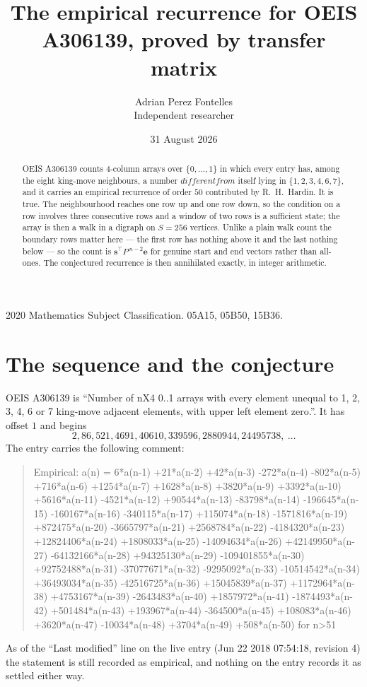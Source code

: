 \documentclass[11pt,a4paper]{article}
\title{The empirical recurrence for OEIS A306139, proved by transfer matrix}
\author{Adrian Perez Fontelles\\ \small Independent researcher}
\date{31 August 2026}
\theoremstyle{plain}
\theoremstyle{definition}
\begin{document}
\maketitle

\begin{abstract}
OEIS A306139 counts $4$-column arrays over $\{0,\dots,1\}$ in which every entry has,
among the eight king-move neighbours, a number $different from$ itself lying in $\{1,2,3,4,6,7\}$, and it carries an empirical
recurrence of order $50$ contributed by R.~H.~Hardin. It is true. The neighbourhood
reaches one row up and one row down, so the condition on a row involves three consecutive
rows and a window of two rows is a sufficient state; the array is then a walk in a digraph
on $S=256$ vertices. Unlike a plain walk count the boundary rows matter here --- the first
row has nothing above it and the last nothing below --- so the count is
$\mathbf{s}^{\!\top}P^{\,n-2}\mathbf{e}$ for genuine start and end vectors rather than
all-ones. The conjectured recurrence is then annihilated exactly, in integer arithmetic.
\end{abstract}

\noindent\small 2020 Mathematics Subject Classification. 05A15, 05B50, 15B36.\normalsize

\section{The sequence and the conjecture}

OEIS A306139 is ``Number of nX4 0..1 arrays with every element unequal to 1, 2, 3, 4, 6 or 7 king-move adjacent elements, with upper left element zero.''. It has offset
$1$ and begins
\[
2, 86, 521, 4691, 40610, 339596, 2880944, 24495738,\ \dots
\]
The entry carries the following comment:
\begin{quote}\small
Empirical: a(n) = 6*a(n-1) +21*a(n-2) +42*a(n-3) -272*a(n-4) -802*a(n-5) +716*a(n-6) +1254*a(n-7) +1628*a(n-8) +3820*a(n-9) +3392*a(n-10) +5616*a(n-11) -4521*a(n-12) +90544*a(n-13) -83798*a(n-14) -196645*a(n-15) -160167*a(n-16) -340115*a(n-17) +115074*a(n-18) -1571816*a(n-19) +872475*a(n-20) -3665797*a(n-21) +2568784*a(n-22) -4184320*a(n-23) +12824406*a(n-24) +1808033*a(n-25) -14094634*a(n-26) +42149950*a(n-27) -64132166*a(n-28) +94325130*a(n-29) -109401855*a(n-30) +92752488*a(n-31) -37077671*a(n-32) -9295092*a(n-33) -10514542*a(n-34) +36493034*a(n-35) -42516725*a(n-36) +15045839*a(n-37) +1172964*a(n-38) +4753167*a(n-39) -2643483*a(n-40) +1857972*a(n-41) -1874493*a(n-42) +501484*a(n-43) +193967*a(n-44) -364500*a(n-45) +108083*a(n-46) +3620*a(n-47) -10034*a(n-48) +3704*a(n-49) +508*a(n-50) for n>51
\end{quote}
As of the ``Last modified'' line on the live entry (Jun 22 2018 07:54:18, revision
4) the statement is still recorded as empirical, and nothing on the entry
records it as settled either way.
\end{document}
